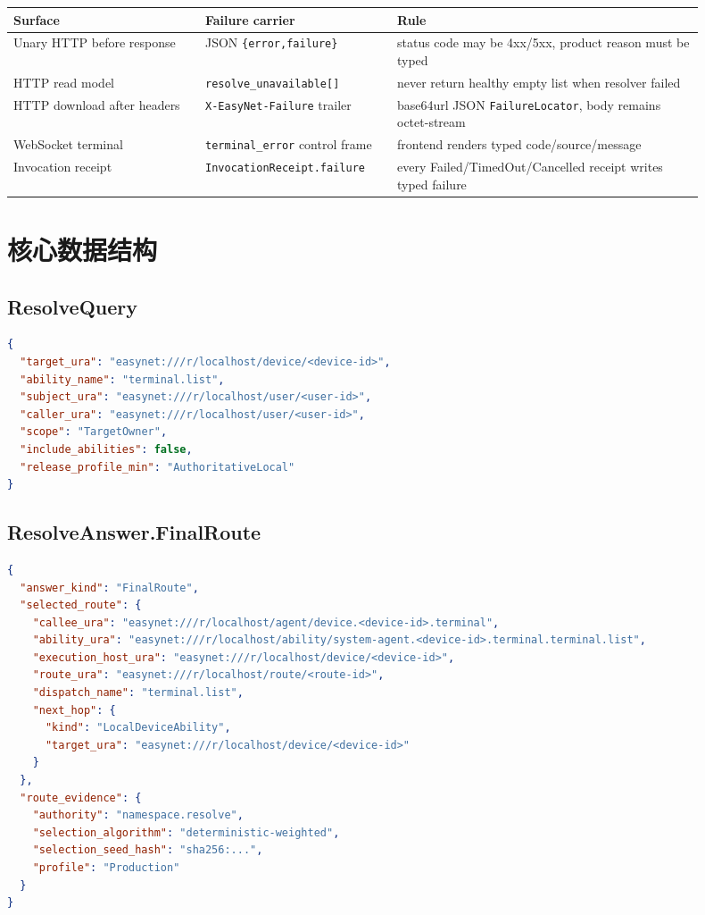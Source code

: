 \documentclass[11pt]{article}
\newcommand{\code}[1]{\texttt{#1}}
\begin{document}
\begin{longtable}{L{0.25\linewidth} L{0.25\linewidth} L{0.40\linewidth}}
\toprule
Surface & Failure carrier & Rule \\
\midrule
Unary HTTP before response & JSON \code{\{error,failure\}} & status code may be 4xx/5xx, product reason must be typed \\
HTTP read model & \code{resolve\_unavailable[]} & never return healthy empty list when resolver failed \\
HTTP download after headers & \code{X-EasyNet-Failure} trailer & base64url JSON \code{FailureLocator}, body remains octet-stream \\
WebSocket terminal & \code{terminal\_error} control frame & frontend renders typed code/source/message \\
Invocation receipt & \code{InvocationReceipt.failure} & every Failed/TimedOut/Cancelled receipt writes typed failure \\
\bottomrule
\end{longtable}

\section{核心数据结构}

\subsection{ResolveQuery}

\begin{lstlisting}[language=json]
{
  "target_ura": "easynet:///r/localhost/device/<device-id>",
  "ability_name": "terminal.list",
  "subject_ura": "easynet:///r/localhost/user/<user-id>",
  "caller_ura": "easynet:///r/localhost/user/<user-id>",
  "scope": "TargetOwner",
  "include_abilities": false,
  "release_profile_min": "AuthoritativeLocal"
}
\end{lstlisting}

\subsection{ResolveAnswer.FinalRoute}

\begin{lstlisting}[language=json]
{
  "answer_kind": "FinalRoute",
  "selected_route": {
    "callee_ura": "easynet:///r/localhost/agent/device.<device-id>.terminal",
    "ability_ura": "easynet:///r/localhost/ability/system-agent.<device-id>.terminal.terminal.list",
    "execution_host_ura": "easynet:///r/localhost/device/<device-id>",
    "route_ura": "easynet:///r/localhost/route/<route-id>",
    "dispatch_name": "terminal.list",
    "next_hop": {
      "kind": "LocalDeviceAbility",
      "target_ura": "easynet:///r/localhost/device/<device-id>"
    }
  },
  "route_evidence": {
    "authority": "namespace.resolve",
    "selection_algorithm": "deterministic-weighted",
    "selection_seed_hash": "sha256:...",
    "profile": "Production"
  }
}
\end{lstlisting}
\end{document}
